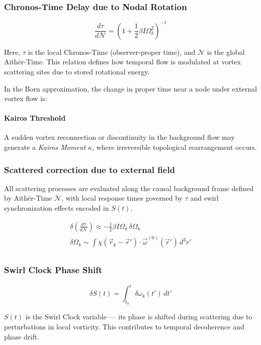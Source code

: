 \subsubsection*{Chronos-Time Delay due to Nodal Rotation}

\[
    \frac{d\tau}{d\mathcal{N}} = \left(1 + \frac{1}{2} \beta I \Omega_k^2 \right)^{-1}
\]

Here, \( \tau \) is the local Chronos-Time (observer-proper time), and $\mathcal{N}$ is the global Aithēr-Time. This relation defines how temporal flow is modulated at vortex scattering sites due to stored rotational energy.


In the Born approximation, the change in proper time near a node under external vortex flow is:
\paragraph{Kairos Threshold} A sudden vortex reconnection or discontinuity in the background flow may generate a \emph{Kairos Moment} \( \kappa \), where irreversible topological rearrangement occurs.

\subsubsection*{Scattered correction due to external field}
All scattering processes are evaluated along the causal background frame defined by Aithēr-Time \( \mathcal{N} \), with local response times governed by \( \tau \) and swirl synchronization effects encoded in \( S(t) \).

\begin{gather*}
    \delta \left( \frac{d\tau}{d\mathcal{N}} \right)\approx - \frac{1}{2} \beta I \Omega_k \, \delta \Omega_k\\
    \delta \Omega_k \sim \int \chi(\vec{r}_k - \vec{r}') \cdot \vec{\omega}^{(0)}(\vec{r}') \, d^3r'\\
\end{gather*}

\subsubsection*{Swirl Clock Phase Shift}
\[
    \delta S(t) = \int_{t_0}^{t} \delta \omega_k(t') \, dt'
\]

$S(t)$ is the Swirl Clock variable — its phase is shifted during scattering due to perturbations in local vorticity. This contributes to temporal decoherence and phase drift.



